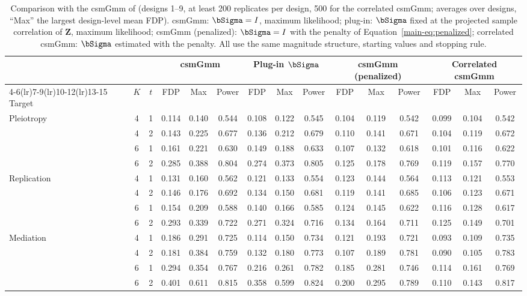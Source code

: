 \begin{table}[!htbp]
\centering
\caption{Comparison with the csmGmm of \citet{Sun2025} (designs 1--9, at least 200 replicates per design, 500 for the correlated csmGmm; averages over designs, ``Max'' the largest design-level mean FDP). csmGmm: $\bSigma=I$, maximum likelihood; plug-in: $\bSigma$ fixed at the projected sample correlation of $\mathbf Z$, maximum likelihood; csmGmm (penalized): $\bSigma=I$ with the penalty of Equation~\eqref{main-eq:penalized}; correlated csmGmm: $\bSigma$ estimated with the penalty. All use the same magnitude structure, starting values and stopping rule.}\label{tab:csm-comparison}
\scriptsize
\setlength{\tabcolsep}{3pt}
\begin{tabular}{lcc ccc ccc ccc ccc}
\toprule
 & & & \multicolumn{3}{c}{csmGmm} & \multicolumn{3}{c}{Plug-in $\bSigma$} & \multicolumn{3}{c}{csmGmm (penalized)} & \multicolumn{3}{c}{Correlated csmGmm}\\
\cmidrule(lr){4-6}\cmidrule(lr){7-9}\cmidrule(lr){10-12}\cmidrule(lr){13-15}
Target & $K$ & $t$ & FDP & Max & Power & FDP & Max & Power & FDP & Max & Power & FDP & Max & Power\\
\midrule
Pleiotropy & 4 & 1 & 0.114 & 0.140 & 0.544 & 0.108 & 0.122 & 0.545 & 0.104 & 0.119 & 0.542 & 0.099 & 0.104 & 0.542\\
 & 4 & 2 & 0.143 & 0.225 & 0.677 & 0.136 & 0.212 & 0.679 & 0.110 & 0.141 & 0.671 & 0.104 & 0.119 & 0.672\\
 & 6 & 1 & 0.161 & 0.221 & 0.630 & 0.149 & 0.188 & 0.633 & 0.107 & 0.132 & 0.618 & 0.101 & 0.116 & 0.622\\
 & 6 & 2 & 0.285 & 0.388 & 0.804 & 0.274 & 0.373 & 0.805 & 0.125 & 0.178 & 0.769 & 0.119 & 0.157 & 0.770\\
\midrule
Replication & 4 & 1 & 0.131 & 0.160 & 0.562 & 0.121 & 0.133 & 0.554 & 0.123 & 0.144 & 0.564 & 0.113 & 0.121 & 0.553\\
 & 4 & 2 & 0.146 & 0.176 & 0.692 & 0.134 & 0.150 & 0.681 & 0.119 & 0.141 & 0.685 & 0.106 & 0.123 & 0.671\\
 & 6 & 1 & 0.154 & 0.209 & 0.588 & 0.140 & 0.166 & 0.585 & 0.124 & 0.145 & 0.622 & 0.116 & 0.128 & 0.617\\
 & 6 & 2 & 0.293 & 0.339 & 0.722 & 0.271 & 0.324 & 0.716 & 0.134 & 0.164 & 0.711 & 0.125 & 0.149 & 0.701\\
\midrule
Mediation & 4 & 1 & 0.186 & 0.291 & 0.725 & 0.114 & 0.150 & 0.734 & 0.121 & 0.193 & 0.721 & 0.093 & 0.109 & 0.735\\
 & 4 & 2 & 0.181 & 0.384 & 0.759 & 0.132 & 0.180 & 0.773 & 0.107 & 0.189 & 0.781 & 0.090 & 0.105 & 0.783\\
 & 6 & 1 & 0.294 & 0.354 & 0.767 & 0.216 & 0.261 & 0.782 & 0.185 & 0.281 & 0.746 & 0.114 & 0.161 & 0.769\\
 & 6 & 2 & 0.401 & 0.611 & 0.815 & 0.358 & 0.599 & 0.824 & 0.200 & 0.295 & 0.789 & 0.110 & 0.143 & 0.817\\
\bottomrule
\end{tabular}
\end{table}
